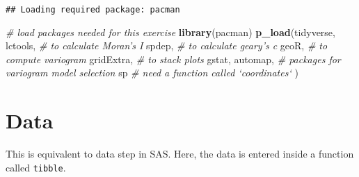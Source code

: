 \documentclass[]{book}
\newenvironment{Shaded}{\begin{snugshade}}{\end{snugshade}}
\newcommand{\CommentTok}[1]{\textcolor[rgb]{0.56,0.35,0.01}{\textit{#1}}}
\newcommand{\DataTypeTok}[1]{\textcolor[rgb]{0.13,0.29,0.53}{#1}}
\newcommand{\DecValTok}[1]{\textcolor[rgb]{0.00,0.00,0.81}{#1}}
\newcommand{\KeywordTok}[1]{\textcolor[rgb]{0.13,0.29,0.53}{\textbf{#1}}}
\newcommand{\NormalTok}[1]{#1}
\newcommand{\OperatorTok}[1]{\textcolor[rgb]{0.81,0.36,0.00}{\textbf{#1}}}
\newcommand{\StringTok}[1]{\textcolor[rgb]{0.31,0.60,0.02}{#1}}
\begin{document}
\begin{verbatim}
## Loading required package: pacman
\end{verbatim}

\begin{Shaded}
\begin{Highlighting}[]
\CommentTok{# load packages needed for this exercise}
\KeywordTok{library}\NormalTok{(pacman)}
\KeywordTok{p_load}\NormalTok{(tidyverse,}
\NormalTok{       lctools, }\CommentTok{# to calculate Moran's I}
\NormalTok{       spdep, }\CommentTok{# to calculate geary's c}
\NormalTok{       geoR, }\CommentTok{# to compute variogram}
\NormalTok{       gridExtra, }\CommentTok{# to stack plots}
\NormalTok{       gstat, automap, }\CommentTok{# packages for variogram model selection}
\NormalTok{       sp }\CommentTok{# need a function called `coordinates`}
\NormalTok{       )}
\end{Highlighting}
\end{Shaded}

\hypertarget{data}{%
\section{Data}\label{data}}

This is equivalent to data step in SAS. Here, the data is entered inside a function called \texttt{tibble}.

\begin{Shaded}
\end{Shaded}
\end{document}
